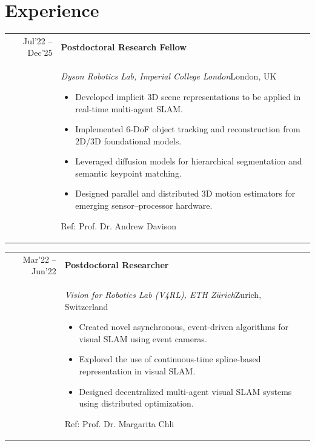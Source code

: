 \documentclass[11pt,a4paper,sans]{moderncv} %
\begin{document}
\vspace{-1.5cm}
\section{Experience}


\newlength{\colsep}
\setlength{\colsep}{0.0cm} %


\newcommand{\WorkExperience}[6]{%
	\noindent
	\begin{tabular*}{\textwidth}{@{\extracolsep{\fill}} r p{0.85\textwidth}}
		{\footnotesize #1} & \textbf{#4}\\
		& \textit{\small #2}\hfill{\footnotesize #3}%
		{\small 
			\begin{itemize}
				#5
			\end{itemize}{\footnotesize Ref: #6}}
	\end{tabular*}%
	\vspace{0.1cm}
}


\WorkExperience
	{Jul'22 -- Dec'25}
	{Dyson Robotics Lab, Imperial College London}
	{London, UK}
	{Postdoctoral Research Fellow}
	{
		\item Developed implicit 3D scene representations to be applied in real-time multi-agent SLAM.
		\item Implemented 6-DoF object tracking and reconstruction from 2D/3D foundational models.
		\item Leveraged diffusion models for hierarchical segmentation and semantic keypoint matching.
		\item Designed parallel and distributed 3D motion estimators for emerging sensor–processor hardware.
	}
	{Prof. Dr. Andrew Davison}

\WorkExperience
{Mar'22 -- Jun'22}
{Vision for Robotics Lab (V4RL), ETH Z\"urich}
{Zurich, Switzerland}
{Postdoctoral Researcher}
{
		\item Created novel asynchronous, event-driven algorithms for visual SLAM using event cameras.
		\item Explored the use of continuous-time spline-based representation in visual SLAM.
		\item Designed decentralized multi-agent visual SLAM systems using distributed optimization.
	}
{Prof. Dr. Margarita Chli}
\end{document}
